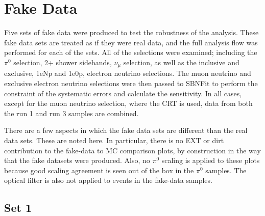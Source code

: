 \section{Fake Data}{}
\label{sec:fakedata}

Five sets of fake data were produced to test the robustness of the analysis.  These fake data sets are treated as if they were real data, and the full analysis flow was performed for each of the sets. All of the selections were examined; including the $\pi^{0}$ selection, 2+ shower sidebands, $\nu_{\mu}$ selection, as well as the inclusive and exclusive, 1eNp and 1e0p, electron neutrino selections.  The muon neutrino and exclusive electron neutrino selections were then passed to SBNFit to perform the constraint of the systematic errors and calculate the sensitivity.  In all cases, except for the muon neutrino selection, where the CRT is used, data from both the run 1 and run 3 samples are combined.

There are a few aspects in which the fake data sets are different than the real data sets. These are noted here.  In particular, there is no EXT or dirt contribution to the fake-data to MC comparison plots, by construction in the way that the fake datasets were produced.  Also, no $\pi^{0}$ scaling is applied to these plots because good scaling agreement is seen out of the box in the $\pi^{0}$ samples. The optical filter is also not applied to events in the fake-data samples.

\newpage

\subsection{Set 1}

